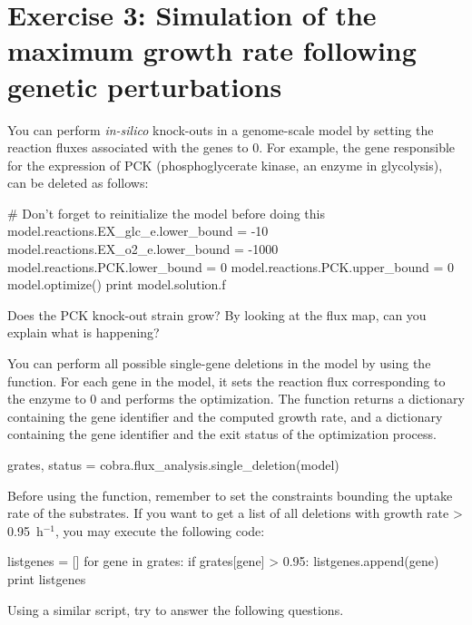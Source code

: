 \section*{Exercise 3: Simulation of the maximum growth rate following genetic perturbations}
\setcounter{section}{3}

You can perform \textit{in-silico} knock-outs in a genome-scale model by 
setting the reaction fluxes associated with the genes to 0.
For example, the gene responsible for the expression of PCK (phosphoglycerate kinase, an enzyme in glycolysis), can be deleted as follows:
\begin{code-python}
# Don't forget to reinitialize the model before doing this
model.reactions.EX_glc_e.lower_bound = -10
model.reactions.EX_o2_e.lower_bound = -1000
model.reactions.PCK.lower_bound = 0
model.reactions.PCK.upper_bound = 0
model.optimize()
print model.solution.f
\end{code-python}

\begin{questions}
\setcounter{question}{0}
\question Does the PCK knock-out strain grow?
By looking at the flux map, can you explain what is happening?
\begin{solutionorbox}[2cm]

\end{solutionorbox}
\end{questions}

You can perform all possible single-gene deletions in the model by using the function\linebreak {}.
For each gene in the model, it sets the reaction flux corresponding to the enzyme to 0 and performs the optimization.
The function returns a dictionary containing the gene identifier and the computed growth rate, and a dictionary containing the gene identifier and the exit status of the optimization process.
\begin{code-python}
grates, status = cobra.flux_analysis.single_deletion(model)
\end{code-python}
Before using the  function, remember to set the constraints bounding the uptake rate of the substrates.
If you want to get a list of all deletions with growth rate > 0.95~h$^{-1}$, you may execute the following code:
\begin{code-python}
listgenes = []
for gene in grates:
	if grates[gene] > 0.95:
		listgenes.append(gene)
print listgenes
\end{code-python}
Using a similar script, try to answer the following questions.

